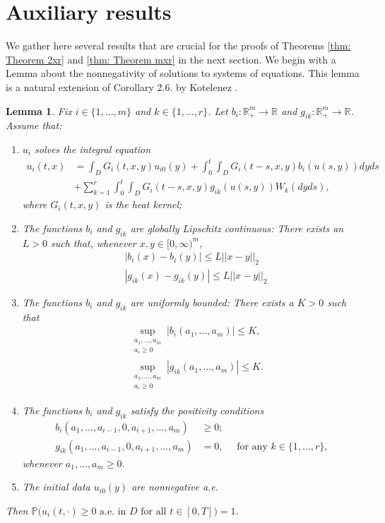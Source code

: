 \documentclass[12pt]{article}
\newtheorem{lemma}{Lemma}
\theoremstyle{definition}
\theoremstyle{remark}
\begin{document}
\section{Auxiliary results}\label{section: preliminary results}
We gather here several results that are crucial for the proofs of Theorems \ref{thm: Theorem 2xr} and \ref{thm: Theorem mxr} in the next section. We begin with a Lemma about the nonnegativity of solutions to systems of equations. This lemma is a natural extension of Corollary 2.6. by Kotelenez \cite{kotelenez1992comparison}.
\begin{lemma}\label{lemma: non negativity of solutions}
Fix $i\in \{1,...,m\}$ and $k\in \{1,...,r\}$. Let $b_i:\mathbb R_{+}^m\to \mathbb R$ and $g_{ik}: \mathbb R^m_{+}\to \mathbb R$. Assume that:
    \begin{enumerate}
        \item $u_i$ solves the integral equation
        \begin{align*}
        u_i(t,x) &= \int_D G_i(t,x,y)u_{i0}(y)+\int_0^t\int_D G_i(t-s,x,y)b_i(u(s,y))dyds\\
    &+ \sum_{k=1}^r \int_0^t\int_D G_i(t-s,x,y)g_{ik}(u(s,y))W_k(dyds),
        \end{align*}
        where $G_i(t,x,y)$ is the heat kernel;
        \item The functions $b_i$ and $g_{ik}$ are globally Lipschitz continuous: There exists an $L>0$ such that, whenever $x,y\in [0,\infty)^m$,
        \begin{align*}
            &|b_i(x)-b_i(y)|\leq L||x-y||_2\\
            &|g_{ik}(x)-g_{ik}(y)|\leq L||x-y||_2
        \end{align*}
        \item The functions $b_i$ and $g_{ik}$ are uniformly bounded: There exists a $K>0$ such that
        \begin{align*}
            &\sup_{\substack{a_1,...,a_m\\ a_i\geq 0}} |b_i(a_1,...,a_m)|\leq K,\\
            &\sup_{\substack{a_1,...,a_m\\ a_i\geq 0}} |g_{ik}(a_1,...,a_m)|\leq K.
        \end{align*}
        \item The functions $b_i$ and $g_{ik}$ satisfy the positivity conditions
        \begin{align*}
        b_i(a_1,...,a_{i-1},0,a_{i+1},...,a_m) &\geq 0;\\
        g_{ik}(a_1,...,a_{i-1},0,a_{i+1},...,a_m) &= 0, \quad \text{ for any } k\in \{1,...,r\},
        \end{align*}
        whenever $a_1,...,a_m\geq 0$.
        \item The initial data $u_{i0}(y)$ are nonnegative a.e.
    \end{enumerate}
    Then $\mathbb{P}\bigl(u_i(t,\cdot)\ge 0 \text{ a.e. in } D \text{ for all } t\in[0,T]\bigr)=1$.
\end{lemma}
\end{document}
